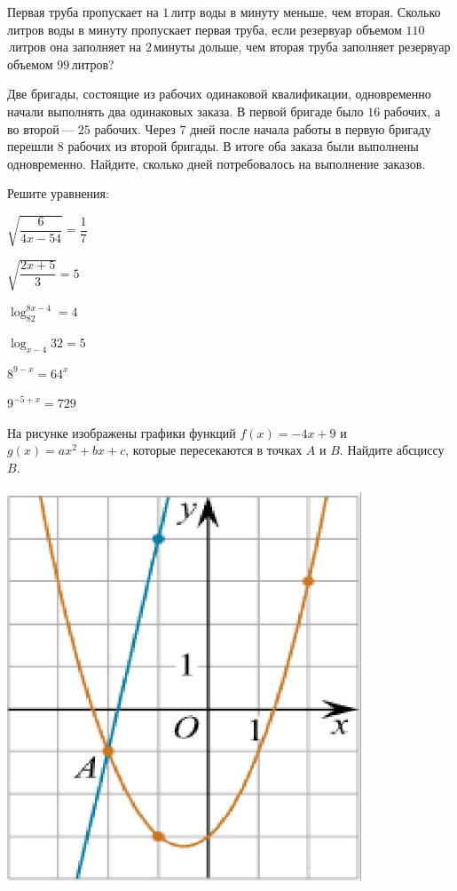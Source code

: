 \begin{listofex}
	\item Первая труба пропускает на \(1\) литр воды в минуту меньше, чем вторая. Сколько литров воды в минуту пропускает первая труба, если резервуар объемом \(110\) литров она заполняет на \(2\) минуты дольше, чем вторая труба заполняет резервуар объемом \(99\) литров?
	\item Две бригады, состоящие из рабочих одинаковой квалификации, одновременно начали выполнять два одинаковых заказа. В первой бригаде было \(16\) рабочих, а во второй — \(25\) рабочих. Через \(7\) дней после начала работы в первую бригаду перешли \(8\) рабочих из второй бригады. В итоге оба заказа были выполнены одновременно. Найдите, сколько дней потребовалось на выполнение заказов.
	\newpage
	\item Решите уравнения:
	\begin{enumcols}[itemcolumns=2]
		\item \( \sqrt{\dfrac{6}{4x-54}}=\dfrac{1}{7} \)
		\item \( \sqrt{\dfrac{2x+5}{3}}=5 \)
		\item \( \log_82^{8x-4}=4 \)
		\item \( \log_{x-4}32=5 \)
		\item \( 8^{9-x}=64^x\)
		\item \( 9^{-5+x}=729 \)
	\end{enumcols}
	\item \begin{minipage}[t]{0.66\textwidth}
		На рисунке изображены графики функций \( f(x)=-4x+9 \) и \( g(x)=ax^2+bx+c \), которые пересекаются в точках \(A\) и \(B\). Найдите абсциссу  \( B \).
	\end{minipage}
	\begin{minipage}[c]{0.3\textwidth}
		\includegraphics[align=b, width=0.8\textwidth]{pics/G111M3H2-1}

\end{minipage}
\end{listofex}
